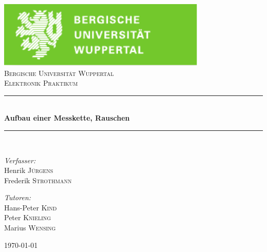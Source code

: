 \documentclass[12pt,a4paper]{article}
\begin{document}


\begin{titlepage}

\begin{center}
\includegraphics[width=0.75\textwidth]{logo.pdf}\\[1cm]    	%

\textsc{\LARGE Bergische Universität Wuppertal}\\[1.5cm]	%

\textsc{\Large Elektronik Praktikum}\\[0.5cm]				%


\newcommand{\HRule}{\rule{\linewidth}{0.5mm}}
\HRule \\[0.4cm]
{ \huge \bfseries Aufbau einer Messkette, Rauschen}\\[0.4cm]				%

\HRule \\[1.5cm]

\begin{minipage}{0.4\textwidth}
\begin{flushleft} \large
\emph{Verfasser:}\\
Henrik \textsc{Jürgens} \\
Frederik \textsc{Strothmann}
\end{flushleft}
\end{minipage}
\hfill
\begin{minipage}{0.4\textwidth}
\begin{flushright} \large
\emph{Tutoren:} \\
Hans-Peter \textsc{Kind} \\
Peter \textsc{Knieling} \\
Marius \textsc{Wensing}
\end{flushright}
\end{minipage}

\vfill

{\large \today}

\end{center}

\end{titlepage}
\end{document}
